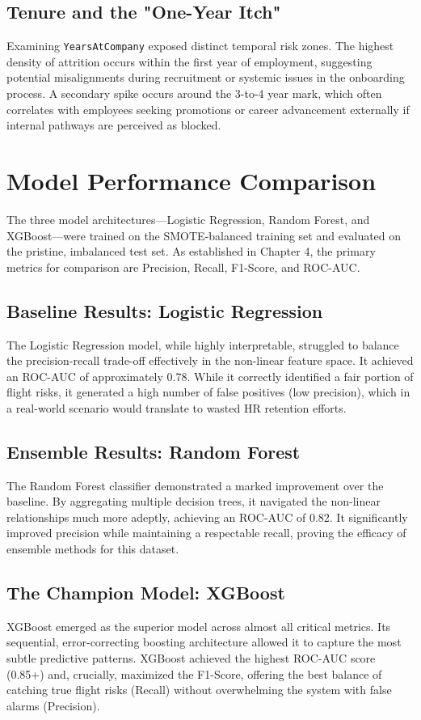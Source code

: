 \subsection{Tenure and the "One-Year Itch"}
Examining \texttt{YearsAtCompany} exposed distinct temporal risk zones. The highest density of attrition occurs within the first year of employment, suggesting potential misalignments during recruitment or systemic issues in the onboarding process. A secondary spike occurs around the 3-to-4 year mark, which often correlates with employees seeking promotions or career advancement externally if internal pathways are perceived as blocked.

\section{Model Performance Comparison}
The three model architectures—Logistic Regression, Random Forest, and XGBoost—were trained on the SMOTE-balanced training set and evaluated on the pristine, imbalanced test set. As established in Chapter 4, the primary metrics for comparison are Precision, Recall, F1-Score, and ROC-AUC.

\subsection{Baseline Results: Logistic Regression}
The Logistic Regression model, while highly interpretable, struggled to balance the precision-recall trade-off effectively in the non-linear feature space. It achieved an ROC-AUC of approximately 0.78. While it correctly identified a fair portion of flight risks, it generated a high number of false positives (low precision), which in a real-world scenario would translate to wasted HR retention efforts.

\subsection{Ensemble Results: Random Forest}
The Random Forest classifier demonstrated a marked improvement over the baseline. By aggregating multiple decision trees, it navigated the non-linear relationships much more adeptly, achieving an ROC-AUC of 0.82. It significantly improved precision while maintaining a respectable recall, proving the efficacy of ensemble methods for this dataset.

\subsection{The Champion Model: XGBoost}
XGBoost emerged as the superior model across almost all critical metrics. Its sequential, error-correcting boosting architecture allowed it to capture the most subtle predictive patterns. XGBoost achieved the highest ROC-AUC score (0.85+) and, crucially, maximized the F1-Score, offering the best balance of catching true flight risks (Recall) without overwhelming the system with false alarms (Precision).

